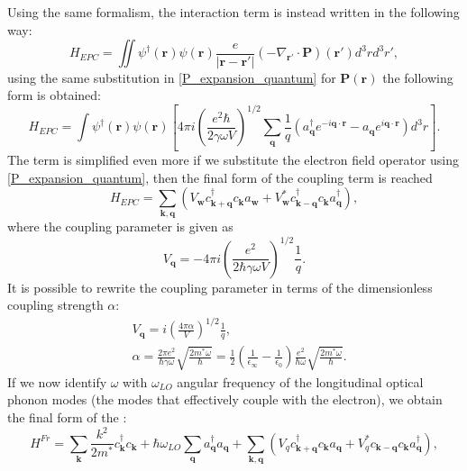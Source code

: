 \documentclass[12pt, a4paper]{report}
\numberwithin{equation}{section}
\begin{document}
Using the same formalism, the interaction term is instead written in the following way:
\begin{equation}
    H_{EPC}=\iint\psi^\dagger(\mathbf{r})\psi(\mathbf{r})\frac{e}{|\mathbf{r}-\mathbf{r}'|}(-\nabla_{\mathbf{r}'}\cdot\mathbf{P})(\mathbf{r}')d^3rd^3r',
\end{equation}
using the same substitution in \ref{P_expansion_quantum} for $\mathbf{P}(\mathbf{r})$ the following form is obtained:
\begin{equation}
    H_{EPC}=\int \psi^\dagger(\mathbf{r})\psi(\mathbf{r})\left[4\pi i \left(\frac{e^2\hbar}{2\gamma\omega V}\right)^{1/2}\sum_\mathbf{q}\frac{1}{q}(a^\dagger_\mathbf{q}e^{-i\mathbf{q}\cdot\mathbf{r}}-a_\mathbf{q}e^{i\mathbf{q}\cdot\mathbf{r}})d^3r\right].
\end{equation}
The term is simplified even more if we substitute the electron field operator using \ref{P_expansion_quantum}, then the final form of 
the coupling term is reached
\begin{equation}
    H_{EPC}=\sum_{\mathbf{k},\mathbf{q}}(V_\mathbf{w}c^\dagger_\mathbf{k+q}c_\mathbf{k}a_\mathbf{w}+V^*_\mathbf{w}c^\dagger_\mathbf{k-q}c_\mathbf{k}a^\dagger_\mathbf{q}),
\end{equation}
where the coupling parameter is given as 
\begin{equation}
    V_\mathbf{q}=-4\pi i\left(\frac{e^2}{2\hbar\gamma\omega V}\right)^{1/2}\frac{1}{q}.
\end{equation}
It is possible to rewrite the coupling parameter in terms of the dimensionless coupling strength $\alpha$:
\begin{equation}
\begin{split}
    &V_\mathbf{q}=i\left(\frac{4\pi\alpha}{V}\right)^{1/2}\frac{1}{q},\\
    &\alpha=\frac{2\pi e^2}{\hbar\gamma\omega}\sqrt{\frac{2m^*\omega}{\hbar}}=\frac{1}{2}\left(\frac{1}{\epsilon_\infty}-\frac{1}{\epsilon_0}\right)\frac{e^2}{\hbar\omega}\sqrt{\frac{2m^*\omega}{\hbar}}.
\end{split}
\end{equation}
If we now identify $\omega$ with $\omega_{LO}$ angular frequency of the longitudinal optical phonon modes (the modes that effectively 
couple with the electron), we obtain the final form of the :
\begin{equation}
    H^{Fr}=\sum_\mathbf{k}\frac{k^2}{2m^*}c^\dagger_{\mathbf{k}}c_\mathbf{k}+\hbar\omega_{LO}\sum_\mathbf{q}a^\dagger_\mathbf{q}a_\mathbf{q}+\sum_{\mathbf{k},\mathbf{q}}(V_qc^\dagger_{\mathbf{k}+\mathbf{q}}c_\mathbf{k}a_\mathbf{q}+V_q^*c_{\mathbf{k}-\mathbf{q}}c_\mathbf{k}a^\dagger_\mathbf{q}),
\end{equation}
\end{document}
